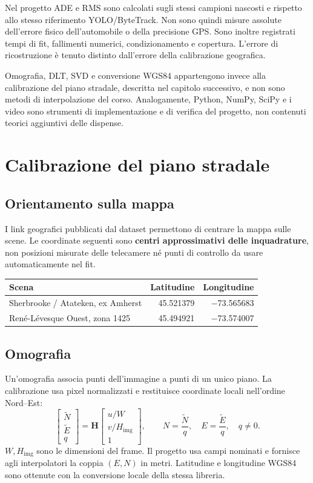 \documentclass[11pt,a4paper]{article}
\numberwithin{equation}{section}
\begin{document}
Nel progetto ADE e RMS sono calcolati sugli stessi campioni nascosti e
rispetto allo stesso riferimento YOLO/ByteTrack. Non sono quindi misure
assolute dell'errore fisico dell'automobile o della precisione GPS.
Sono inoltre registrati tempi di fit, fallimenti numerici, condizionamento
e copertura. L'errore di ricostruzione è tenuto distinto dall'errore della
calibrazione geografica.

Omografia, DLT, SVD e conversione WGS84 appartengono invece alla
calibrazione del piano stradale, descritta nel capitolo successivo, e non
sono metodi di interpolazione del corso. Analogamente, Python, NumPy,
SciPy e i video sono strumenti di implementazione e di verifica del
progetto, non contenuti teorici aggiuntivi delle dispense.

\section{Calibrazione del piano stradale}

\subsection{Orientamento sulla mappa}
I link geografici pubblicati dal dataset permettono di centrare la mappa
sulle scene. Le coordinate seguenti sono \textbf{centri approssimativi
delle inquadrature}, non posizioni misurate delle telecamere né punti di
controllo da usare automaticamente nel fit.

\begin{center}
\begin{tabular}{lrr}
\toprule
Scena & Latitudine & Longitudine\\
\midrule
Sherbrooke / Atateken, ex Amherst & \num{45.521379} & \num{-73.565683}\\
René-Lévesque Ouest, zona 1425 & \num{45.494921} & \num{-73.574007}\\
\bottomrule
\end{tabular}
\end{center}

\subsection{Omografia}
Un'omografia associa punti dell'immagine a punti di un unico piano.
La calibrazione usa pixel normalizzati e restituisce coordinate locali
nell'ordine Nord--Est:
\begin{equation}
 \begin{bmatrix}\widetilde N\\\widetilde E\\q\end{bmatrix}
 =\mathbf H\begin{bmatrix}u/W\\v/H_{\mathrm{img}}\\1\end{bmatrix},
 \qquad N=\frac{\widetilde N}{q},\quad E=\frac{\widetilde E}{q},\quad q\ne0.
\end{equation}
$W,H_{\mathrm{img}}$ sono le dimensioni del frame. Il progetto usa campi
nominati e fornisce agli interpolatori la coppia $(E,N)$ in metri.
Latitudine e longitudine WGS84 sono ottenute con la conversione locale
della stessa libreria.
\end{document}
